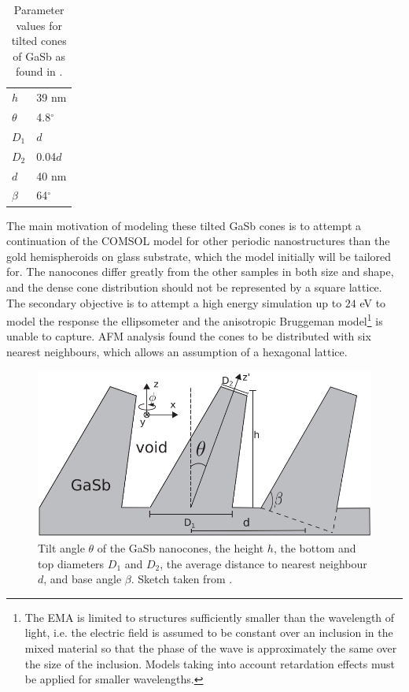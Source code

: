 \begin{table}[h]
\centering
\caption{Parameter values for tilted cones of GaSb as found in \cite{gasbcones}.}
\label{tab:gasbparameters}
\begin{tabular}{l l}
    \hline 
    $h$         &   39 nm    \\
    $\theta$    &   4.8$^\circ$   \\
    $D_1$       &   $d$    \\
    $D_2$       &   0.04$d$    \\
    $d$         &   40 nm   \\
    $\beta$     &   64$^\circ$ \\
    \hline
\end{tabular}
\end{table}


The main motivation of modeling these tilted GaSb cones is to attempt a continuation of the COMSOL model for other periodic nanostructures than the gold hemispheroids on glass substrate, which the model initially will be tailored for. The nanocones differ greatly from the other samples in both size and shape, and the dense cone distribution should not be represented by a square lattice. The secondary objective is to attempt a high energy simulation up to $24$ eV to model the response the ellipsometer and the anisotropic Bruggeman model\footnote{The EMA is limited to structures sufficiently smaller than the wavelength of light, i.e. the electric field is assumed to be constant over an inclusion in the mixed material so that the phase of the wave is approximately the same over the size of the inclusion. Models taking into account retardation effects must be applied for smaller wavelengths.} is unable to capture. AFM analysis found the cones to be distributed with six nearest neighbours, which allows an assumption of a hexagonal lattice\cite{gasbcones}. 

\begin{figure}
    \centering
    \includegraphics[scale=0.33]{figures/Ch3/GaSbConesGeometry.png}
    \caption{Tilt angle $\theta$ of the GaSb nanocones, the height $h$, the bottom and top diameters $D_1$ and $D_2$, the average distance to nearest neighbour $d$, and base angle $\beta$. Sketch taken from \cite{gasbcones}.}    
    \label{fig:GaSbConeGeometry}
\end{figure}




\clearpage